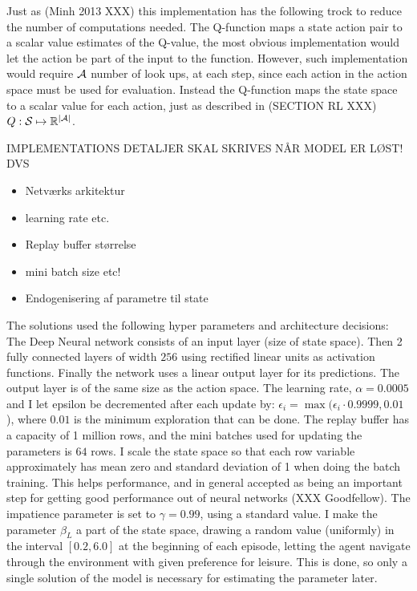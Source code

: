 Just as (Minh 2013 XXX) this implementation has the following trock to reduce the number of computations needed. The Q-function maps a state action pair to a scalar value estimates of the Q-value, the most obvious implementation would let the action be part of the input to the function. However, such implementation would require $\mathcal{A}$ number of look ups, at each step, since each action in the action space must be used for evaluation. Instead the Q-function maps the state space to a scalar value for each action, just as described in (SECTION RL XXX) $Q: \mathcal{S} \mapsto \mathbb{R}^{\mid \mathcal{A} \mid}$. 

IMPLEMENTATIONS DETALJER SKAL SKRIVES NÅR MODEL ER LØST! DVS

\begin{itemize}
    \item Netværks arkitektur
    \item learning rate etc.
    \item Replay buffer størrelse
    \item mini batch size etc!
    \item Endogenisering af parametre til state
\end{itemize}

The solutions used the following hyper parameters and architecture decisions: The Deep Neural network consists of an input layer (size of state space). Then  2 fully connected layers of width $256$ using rectified linear units as activation functions. Finally the network uses a linear output layer for its predictions. The output layer is of the same size as the action space. The learning rate, $\alpha=0.0005$ and I let epsilon be decremented after each update by: $\epsilon_i = \max (\epsilon_i \cdot 0.9999, 0.01$), where $0.01$ is the minimum exploration that can be done. The replay buffer has a capacity of 1 million rows, and the mini batches used for updating the parameters is $64$ rows. I scale the state space so that each row variable approximately has mean zero and standard deviation of 1 when doing the batch training. This helps performance, and in general accepted as being an important step for getting good performance out of neural networks (XXX Goodfellow). The impatience parameter is set to $\gamma=0.99$, using a standard value. I make the parameter $\beta_L$ a part of the state space, drawing a random value (uniformly) in the interval $[0.2, 6.0]$ at the beginning of each episode, letting the agent navigate through the environment with given preference for leisure. This is done, so only a single solution of the model is necessary for estimating the parameter later.



